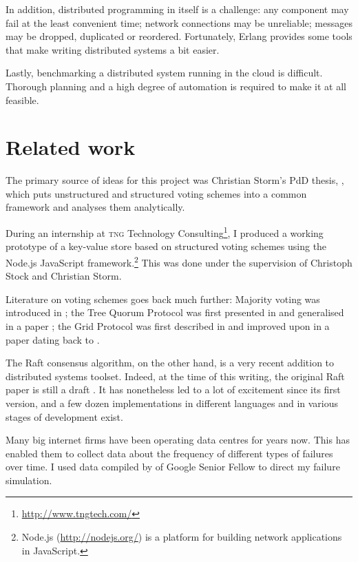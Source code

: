 \documentclass[draft,11pt,chapterprefix=true,toc=bibliography,numbers=noendperiod,
               footnotes=multiple,twoside]{scrreprt}
\begin{document}
In addition, distributed programming in itself is a challenge: any component may fail at the least convenient time; network connections may be unreliable; messages may be dropped, duplicated or reordered. Fortunately, Erlang provides some tools that make writing distributed systems a bit easier.

Lastly, benchmarking a distributed system running in the cloud is difficult. Thorough planning and a high degree of automation is required to make it at all feasible.

\section{Related work\label{sc:related-work}}

The primary source of ideas for this project was Christian Storm's PdD thesis,  \parencite{voting}, which puts unstructured and structured voting schemes into a common framework and analyses them analytically.

During an internship at \textsc{tng} Technology Consulting\footnote{\url{http://www.tngtech.com/}}, I produced a working prototype of a key-value store based on structured voting schemes using the Node.js JavaScript framework.\footnote{Node.js (\url{http://nodejs.org/}) is a platform for building network applications in JavaScript.} This was done under the supervision of Christoph Stock and Christian Storm.

Literature on voting schemes goes back much further: Majority voting was introduced in  \autocite{majority}; the Tree Quorum Protocol was first presented in  \autocite{tree} and generalised in a  paper \autocite{gen-tree}; the Grid Protocol was first described in  \autocite{grid} and improved upon in a paper dating back to  \autocite{bettergrid}.

The Raft consensus algorithm, on the other hand, is a very recent addition to distributed systems toolset. Indeed, at the time of this writing, the original Raft paper is still a draft \autocite{raft}. It has nonetheless led to a lot of excitement since its first version, and a few dozen implementations in different languages and in various stages of development exist.

Many big internet firms have been operating data centres for years now. This has enabled them to collect data about the frequency of different types of failures over time. I used data compiled by of Google Senior Fellow \citeauthor{distr} \autocite{distr} to direct my failure simulation.
\end{document}
